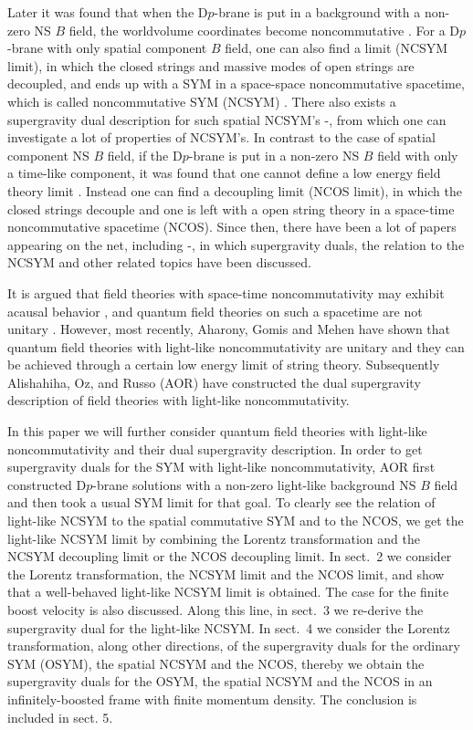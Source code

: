 \documentclass[a4paper,12pt]{article}
\begin{document}
Later it was found that when the D$p$-brane is put in a background with a
non-zero NS $B$ field, the worldvolume coordinates become noncommutative
\cite{Dougl,Chu,Arda}. For a D$p$-brane with only spatial component $B$ field,
one can also find a limit (NCSYM limit), in which the closed strings and
massive modes of open strings are decoupled, and ends up with a SYM in a
space-space noncommutative spacetime, which is called noncommutative SYM
(NCSYM) \cite{Seib1}. There also exists a supergravity dual description for
such spatial NCSYM's \cite{Mald2}-\cite{Youm},
from which one can investigate a lot of properties of NCSYM's. In contrast
to the case of spatial component NS $B$ field, if the D$p$-brane is put in
a non-zero NS $B$ field with only a time-like component, it was found that
one cannot define a low energy field theory limit \cite{Seib2,Gopa1,Barb2}.
Instead one can find a decoupling limit (NCOS limit), in which the closed
strings decouple and one is left with a open string theory in a space-time
noncommutative spacetime (NCOS). Since then, there have been a lot of papers
appearing on the net, including \cite{Seib3}-\cite{LRS2}, in which
supergravity duals, the relation to the NCSYM and other related topics
have been discussed.

It is argued that field theories with space-time noncommutativity may
exhibit acausal behavior \cite{Seib3,Alva}, and quantum field theories on
such a spacetime are not unitary \cite{Gomi}. However, most recently,
Aharony, Gomis and Mehen \cite{AGM} have shown that quantum field theories
with light-like noncommutativity are unitary and they can be achieved through
a certain low energy limit of string theory. Subsequently Alishahiha, Oz, and
Russo (AOR)\cite{AOR} have constructed the dual supergravity description of
field theories with light-like noncommutativity.

In this paper we will further consider quantum field theories with light-like
noncommutativity and their dual supergravity description. In order to get
supergravity duals for the SYM with light-like noncommutativity,
AOR first constructed D$p$-brane solutions with
a non-zero light-like background NS $B$ field and then took a usual SYM
limit for that goal. To clearly see the relation of light-like
NCSYM to the spatial commutative SYM and to the NCOS, we get the
light-like NCSYM limit by combining the Lorentz transformation and the
NCSYM decoupling limit or the NCOS decoupling limit. In sect.~2
we consider the Lorentz transformation, the NCSYM limit and the NCOS
limit, and show that a well-behaved light-like NCSYM limit is obtained.
The case for the finite boost velocity is also discussed. Along this
line, in sect.~3 we re-derive the supergravity dual for the light-like
NCSYM. In sect.~4 we consider the Lorentz transformation, along other
directions, of the supergravity duals for the ordinary SYM (OSYM),
the spatial NCSYM and the NCOS, thereby we obtain the supergravity duals
for the OSYM, the spatial NCSYM and the NCOS in an
infinitely-boosted frame with finite momentum density. The conclusion is
included in sect. 5.
\end{document}
